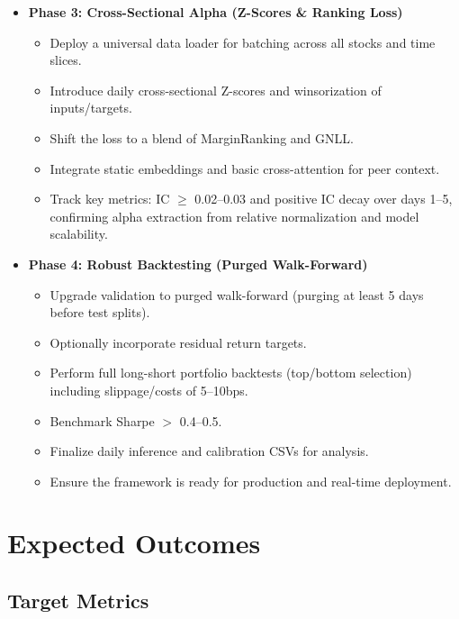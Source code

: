 \documentclass[twoside,final]{hcmut-report}
\begin{document}
\begin{itemize}
  \item \textbf{Phase 3: Cross-Sectional Alpha (Z-Scores \& Ranking Loss)}
        \begin{itemize}
          \item Deploy a universal data loader for batching across all stocks and time slices.
          \item Introduce daily cross-sectional Z-scores and winsorization of inputs/targets.
          \item Shift the loss to a blend of MarginRanking and GNLL.
          \item Integrate static embeddings and basic cross-attention for peer context.
          \item Track key metrics: IC $\geq$ 0.02--0.03 and positive IC decay over days 1--5, confirming alpha extraction from relative normalization and model scalability.
        \end{itemize}

  \item \textbf{Phase 4: Robust Backtesting (Purged Walk-Forward)}
        \begin{itemize}
          \item Upgrade validation to purged walk-forward (purging at least 5 days before test splits).
          \item Optionally incorporate residual return targets.
          \item Perform full long-short portfolio backtests (top/bottom selection) including slippage/costs of 5--10bps.
          \item Benchmark Sharpe $>$ 0.4--0.5.
          \item Finalize daily inference and calibration CSVs for analysis.
          \item Ensure the framework is ready for production and real-time deployment.
        \end{itemize}
\end{itemize}


\section{Expected Outcomes}

\subsection{Target Metrics}
\end{document}
